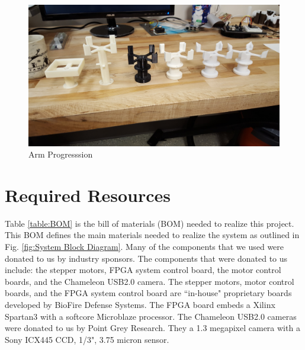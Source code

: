 \documentclass[final, letterpaper, 10 pt, conference, twocolumn]{IEEEtran}
\begin{document}
\begin{figure}[!ht]
\centering
\includegraphics[width=\linewidth]{ArmProgression.jpg}
\caption{Arm Progresssion}
\label{fig:Arm Progression}
\end{figure}

\section{Required Resources}
Table \ref{table:BOM} is the bill of materials (BOM) needed to realize this project. This BOM defines the main materials needed to realize the system as outlined in Fig. \ref{fig:System Block Diagram}.
Many of the components that we used were donated to us by industry sponsors. The components that were donated to us include: the stepper motors, FPGA system control board, the
motor control boards, and the Chameleon USB2.0 camera. The stepper motors, motor control boards, and the FPGA system control board are ``in-house" proprietary boards developed by BioFire Defense Systems.
The FPGA board embeds a Xilinx Spartan3 with a softcore Microblaze processor. The Chameleon USB2.0 cameras were donated to us by Point Grey Research. They a 1.3 megapixel camera with a Sony ICX445 CCD, 1/3", 3.75 micron sensor.
\end{document}
